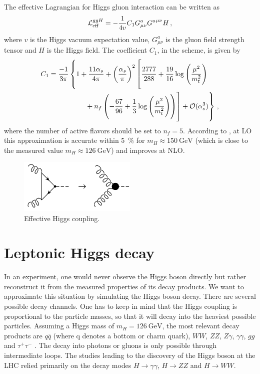 The effective Lagrangian for Higgs gluon interaction can be written as \cite{gfusionnnlo2}
%
\begin{equation}
	\operatorname{\mathcal{L}}_\text{eff}^{ggH} = - \frac{1}{4v} C_1 G_{\mu \nu}^a {G^a}^{\mu \nu} H \, ,
\end{equation}
%
where $v$ is the Higgs vacuum expectation value, $G^a_{\mu \nu}$ is the gluon field strength tensor and $H$ is the Higgs field.
The coefficient $C_1$, in the \msbar{} scheme, is given by
%
\begin{align}
	C_1 = \frac{-1}{3 \pi} &\left\{1 + \frac{11 \alpha_s}{4 \pi} + \left( \frac{\alpha_s}{\pi} \right)^2 \left[ \frac{2777}{288} + \frac{19}{16} \log\left( \frac{\mu^2}{m_t^2} \right)
	\vphantom{n_f \left( -\frac{67}{96} + \frac{1}{3} \log\left( \frac{\mu^2}{m_t^2} \right) \right)} \right. \right. \nonumber \\
		&\qquad \left. \left. \vphantom{\frac{2777}{288} + \frac{19}{16} \log\left( \frac{\mu^2}{m_t^2} \right)}
		+ n_f \left( -\frac{67}{96} + \frac{1}{3} \log\left( \frac{\mu^2}{m_t^2} \right) \right) \right] + \order{\alpha_s^3} \right\} \, ,
\end{align}
%
where the number of active flavors should be set to $n_f = 5$.
According to \cite{gfusionnnlo2}, at LO this approximation is accurate within \SI{5}{\percent} for $m_H \approx \SI{150}{\giga\electronvolt}$ (which is close to the measured value $m_H \approx \SI{126}{\giga\electronvolt}$) and improves at NLO.
%
\begin{figure}[]
	\includegraphics[width=0.5\textwidth]{images/heft.pdf}
	\caption{Effective Higgs coupling.}
	\label{fig:heft}
\end{figure}
%

\section{Leptonic Higgs decay}
In an experiment, one would never observe the Higgs boson directly but rather reconstruct it from the measured properties of its decay products.
We want to approximate this situation by simulating the Higgs boson decay.
There are several possible decay channels.
One has to keep in mind that the Higgs coupling is proportional to the particle masses, so that it will decay into the heaviest possible particles.
Assuming a Higgs mass of $m_H = \SI{126}{\giga\electronvolt}$, the most relevant decay products are $q \bar q$ (where q denotes a bottom or charm quark), $WW$, $ZZ$, $Z \gamma$, $\gamma \gamma$, $gg$ and $\tau^+ \tau^-$ \cite{higgshandbook2}.
The decay into photons or gluons is only possible through intermediate loops.
The studies leading to the discovery of the Higgs boson at the LHC relied primarily on the decay modes $H \rightarrow \gamma \gamma$, $H \rightarrow ZZ$ and $H \rightarrow WW$.

